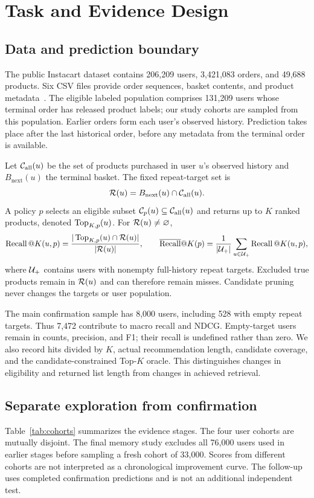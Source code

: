 \section{Task and Evidence Design}
\label{sec:task}

\subsection{Data and prediction boundary}
The public Instacart dataset contains 206,209 users, 3,421,083 orders, and 49,688 products. Six CSV files provide order sequences, basket contents, and product metadata~\citep{instacart2017,kaggle}. The eligible labeled population comprises 131,209 users whose terminal order has released product labels; our study cohorts are sampled from this population. Earlier orders form each user's observed history. Prediction takes place after the last historical order, before any metadata from the terminal order is available.

Let $\mathcal{C}_{\mathrm{all}}(u)$ be the set of products purchased in user $u$'s observed history and $B_{\mathrm{next}}(u)$ the terminal basket. The fixed repeat-target set is
\begin{equation}
  \mathcal{R}(u)=B_{\mathrm{next}}(u)\cap\mathcal{C}_{\mathrm{all}}(u).
  \label{eq:target}
\end{equation}
A policy $p$ selects an eligible subset $\mathcal{C}_p(u)\subseteq\mathcal{C}_{\mathrm{all}}(u)$ and returns up to $K$ ranked products, denoted $\operatorname{Top}_{K,p}(u)$. For $\mathcal{R}(u)\ne\varnothing$,
\begin{equation}
  \Recall@K(u,p)=\frac{|\TopItems_{K,p}(u)\cap\R(u)|}{|\R(u)|},\qquad
  \overline{\Recall}@K(p)=\frac{1}{|\Uplus|}\sum_{u\in\Uplus}\Recall@K(u,p),
  \label{eq:recall}
\end{equation}
where $\mathcal{U}_{+}$ contains users with nonempty full-history repeat targets. Excluded true products remain in $\mathcal{R}(u)$ and can therefore remain misses. Candidate pruning never changes the targets or user population.

The main confirmation sample has 8,000 users, including 528 with empty repeat targets. Thus 7,472 contribute to macro recall and NDCG. Empty-target users remain in counts, precision, and F1; their recall is undefined rather than zero. We also record hits divided by $K$, actual recommendation length, candidate coverage, and the candidate-constrained Top-$K$ oracle. This distinguishes changes in eligibility and returned list length from changes in achieved retrieval.

\subsection{Separate exploration from confirmation}
Table~\ref{tab:cohorts} summarizes the evidence stages. The four user cohorts are mutually disjoint. The final memory study excludes all 76,000 users used in earlier stages before sampling a fresh cohort of 33,000. Scores from different cohorts are not interpreted as a chronological improvement curve. The follow-up uses completed confirmation predictions and is not an additional independent test.

